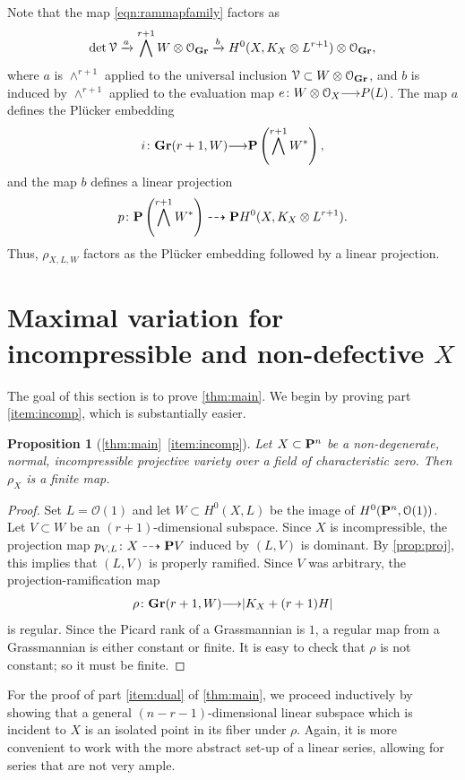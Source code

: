 \documentclass[11pt,reqno]{amsart}
\theoremstyle{plain}
\newtheorem{proposition}[theorem]{Proposition}
\theoremstyle{definition}
\theoremstyle{remark}
\numberwithin{equation}{section}
\renewcommand{\to}{{\longrightarrow}}
\numberwithin{equation}{section}
\renewcommand{\O}{\mathcal O}
\begin{document}
Note that the map \eqref{eqn:rammapfamily} factors as
\[ \det \mathcal V \xrightarrow{a} \bigwedge^{r+1} W \otimes \O_{\Gr} \xrightarrow{b} H^0(X, K_X \otimes L^{r+1}) \otimes \O_{\Gr},\]
where $a$ is $\wedge^{r+1}$ applied to the universal inclusion $\mathcal V \subset W \otimes \O_{\Gr}$, and $b$ is induced by $\wedge^{r+1}$ applied to the evaluation map $e \from W \otimes \O_{X} \to P(L)$.
The map $a$ defines the Pl\"ucker embedding
\[ i \from \Gr(r+1, W) \to \P \left(\bigwedge^{r+1}W^*\right),\]
and the map $b$ defines a linear projection
\[ p \from \P \left(\bigwedge^{r+1}W^*\right) \dashrightarrow \P H^0(X, K_X \otimes L^{r+1}).\]
Thus, $\rho_{X,L,W}$ factors as the Pl\"ucker embedding followed by a linear projection.

\section{Maximal variation for incompressible and non-defective $X$}
\label{sec:proof_of_theorem:main}
The goal of this section is to prove \autoref{thm:main}.
We begin by proving part \eqref{item:incomp}, which is substantially easier.
\begin{proposition}[\autoref{thm:main}~\eqref{item:incomp}]
  \label{prop:incompress}
  Let $X \subset \P^n$ be a non-degenerate, normal, incompressible projective variety over a field of characteristic zero.
  Then $\rho_X$ is a finite map.
\end{proposition}
\begin{proof}
  Set $L = \O(1)$ and let $W \subset H^0(X, L)$ be the image of $H^0(\P^n, \O(1))$.
  Let $V \subset W$ be an $(r+1)$-dimensional subspace.
  Since $X$ is incompressible, the projection map $p_{V,L} \from X \dashrightarrow \P V$ induced by $(L, V)$ is dominant.
  By \autoref{prop:proj}, this implies that $(L, V)$ is properly ramified.
  Since $V$ was arbitrary, the projection-ramification map 
  \[ \rho \from \Gr(r+1, W) \to |K_X + (r+1) H|\]
  is regular.
  Since the Picard rank of a Grassmannian is $1$, a regular map from a Grassmannian is either constant or finite.
  It is easy to check that $\rho$ is not constant; so it must be finite.
\end{proof}

For the proof of part \eqref{item:dual} of \autoref{thm:main}, we proceed inductively by showing that a general $(n-r-1)$-dimensional linear subspace which is incident to $X$ is an isolated point in its fiber under $\rho$.
Again, it is more convenient to work with the more abstract set-up of a linear series, allowing for series that are not very ample.
\end{document}

